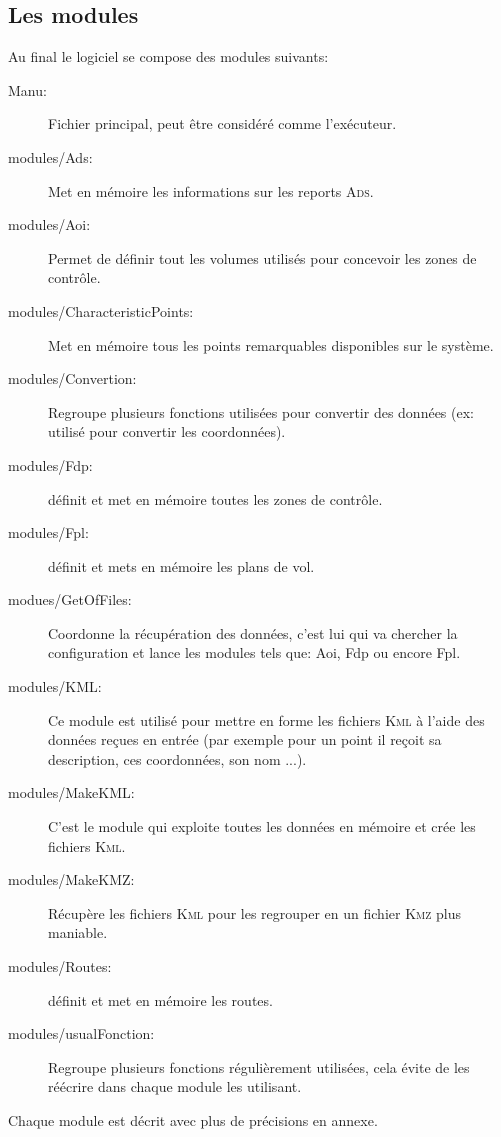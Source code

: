     \subsection{Les modules}
Au final le logiciel se compose des modules suivants:
\begin{description}
\item[Manu:] Fichier principal, peut être considéré comme l'exécuteur. 
\item[modules/Ads:] Met en mémoire les informations sur les reports \textsc{Ads}. 
\item[modules/Aoi:] Permet de définir tout les volumes utilisés pour concevoir les zones de contrôle. 
\item[modules/CharacteristicPoints:] Met en mémoire tous les points remarquables disponibles sur le système. 
\item[modules/Convertion:] Regroupe plusieurs fonctions utilisées pour convertir des données (ex: utilisé pour convertir les coordonnées). 
\item[modules/Fdp:] définit et met en mémoire toutes les zones de contrôle. 
\item[modules/Fpl:] définit et mets en mémoire les plans de vol. 
\item[modues/GetOfFiles:] Coordonne la récupération des données, c'est lui qui va chercher la configuration et lance les modules tels que: Aoi, Fdp ou encore Fpl. 
\item[modules/KML:] Ce module est utilisé pour mettre en forme les fichiers \textsc{Kml} à l'aide des données reçues en entrée (par exemple pour un point il reçoit sa description, ces coordonnées, son nom ...). 
\item[modules/MakeKML:] C'est le module qui exploite toutes les données en mémoire et crée les fichiers \textsc{Kml}. 
\item[modules/MakeKMZ:] Récupère les fichiers \textsc{Kml} pour les regrouper en un fichier \textsc{Kmz} plus maniable. 
\item[modules/Routes:] définit et met en mémoire les routes. 
\item[modules/usualFonction:] Regroupe plusieurs fonctions régulièrement utilisées, cela évite de les réécrire dans chaque module les utilisant. 
\end{description}
Chaque module est décrit avec plus de précisions en annexe.

